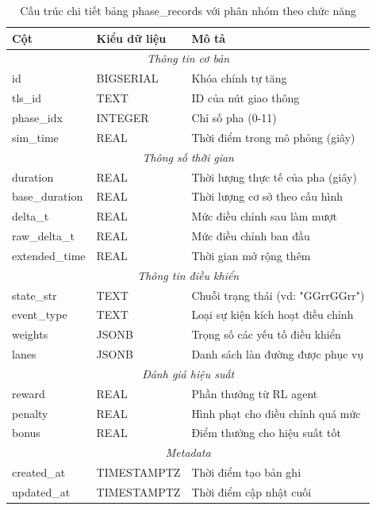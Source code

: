 \begin{table}[H]
\centering
\footnotesize
\begin{tabular}{|l|l|p{6cm}|}
\hline
\textbf{Cột} & \textbf{Kiểu dữ liệu} & \textbf{Mô tả} \\
\hline
\hline
\multicolumn{3}{|c|}{\textit{Thông tin cơ bản}} \\
\hline
id & BIGSERIAL & Khóa chính tự tăng \\
tls\_id & TEXT & ID của nút giao thông \\
phase\_idx & INTEGER & Chỉ số pha (0-11) \\
sim\_time & REAL & Thời điểm trong mô phỏng (giây) \\
\hline
\multicolumn{3}{|c|}{\textit{Thông số thời gian}} \\
\hline
duration & REAL & Thời lượng thực tế của pha (giây) \\
base\_duration & REAL & Thời lượng cơ sở theo cấu hình \\
delta\_t & REAL & Mức điều chỉnh sau làm mượt \\
raw\_delta\_t & REAL & Mức điều chỉnh ban đầu \\
extended\_time & REAL & Thời gian mở rộng thêm \\
\hline
\multicolumn{3}{|c|}{\textit{Thông tin điều khiển}} \\
\hline
state\_str & TEXT & Chuỗi trạng thái (vd: "GGrrGGrr") \\
event\_type & TEXT & Loại sự kiện kích hoạt điều chỉnh \\
weights & JSONB & Trọng số các yếu tố điều khiển \\
lanes & JSONB & Danh sách làn đường được phục vụ \\
\hline
\multicolumn{3}{|c|}{\textit{Đánh giá hiệu suất}} \\
\hline
reward & REAL & Phần thưởng từ RL agent \\
penalty & REAL & Hình phạt cho điều chỉnh quá mức \\
bonus & REAL & Điểm thưởng cho hiệu suất tốt \\
\hline
\multicolumn{3}{|c|}{\textit{Metadata}} \\
\hline
created\_at & TIMESTAMPTZ & Thời điểm tạo bản ghi \\
updated\_at & TIMESTAMPTZ & Thời điểm cập nhật cuối \\
\hline
\end{tabular}
\caption{Cấu trúc chi tiết bảng phase\_records với phân nhóm theo chức năng}
\label{tab:phase_records_detailed}
\end{table}

